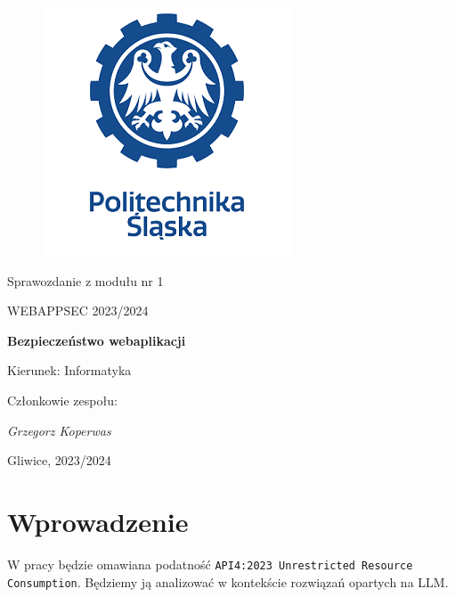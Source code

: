 \documentclass[12pt,a4paper]{article}
\begin{document}
\renewcommand\thesection{\arabic{section}.}
\renewcommand\thesubsection{\arabic{section}.\arabic{subsection}.}
\renewcommand\thesubsubsection{\arabic{subsubsection}.}

\clearpage
\begin{figure}[h]
\centering
\includegraphics{media/ps-logo.png}
\end{figure}
\hspace{3cm}
\begin{center}Sprawozdanie z modułu nr 1\end{center}
\begin{center}WEBAPPSEC 2023/2024\end{center}
\hspace{3cm}
\begin{center}\large\textbf{Bezpieczeństwo webaplikacji}\end{center}
\hspace{7cm}
\begin{flushright}Kierunek: Informatyka
\end{flushright}
\begin{flushright}Członkowie zespołu:
\par
\textit{Grzegorz Koperwas}
\end{flushright}
\vfill
\begin{center}Gliwice, 2023/2024\end{center}

\newpage
{}
\tableofcontents

\newpage
\section{Wprowadzenie}

W pracy będzie omawiana podatność \texttt{API4:2023 Unrestricted Resource
Consumption}. Będziemy ją analizować w kontekście rozwiązań opartych na LLM.
\end{document}
